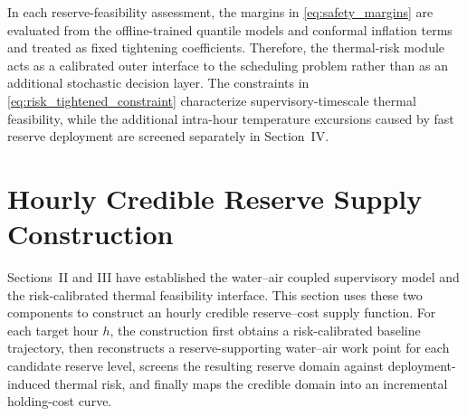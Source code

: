 \documentclass[journal]{IEEEtran}
\theoremstyle{remark}
\begin{document}
In each reserve-feasibility assessment, the margins in
\eqref{eq:safety_margins} are evaluated from the offline-trained
quantile models and conformal inflation terms and treated as fixed
tightening coefficients. Therefore, the thermal-risk module acts as a
calibrated outer interface to the scheduling problem rather than as an
additional stochastic decision layer. The constraints in
\eqref{eq:risk_tightened_constraint} characterize
supervisory-timescale thermal feasibility, while the additional
intra-hour temperature excursions caused by fast reserve deployment
are screened separately in Section~IV.

\section{Hourly Credible Reserve Supply Construction}
\label{sec:hourly_reserve}

Sections~II and III have established the water--air coupled supervisory model and the risk-calibrated thermal feasibility interface. This section uses these two components to construct an hourly credible reserve--cost supply function. For each target hour \(h\), the construction first obtains a risk-calibrated baseline trajectory, then reconstructs a reserve-supporting water--air work point for each candidate reserve level, screens the resulting reserve domain against deployment-induced thermal risk, and finally maps the credible domain into an incremental holding-cost curve.



\end{document}
